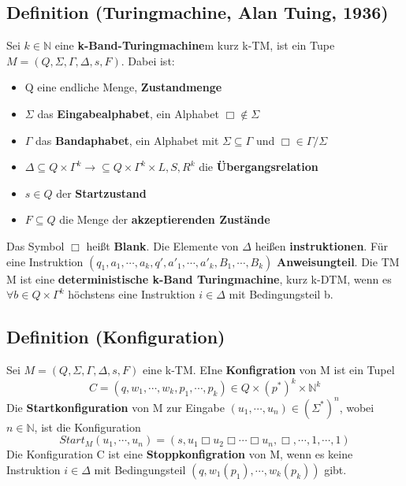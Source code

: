 \subsection{Definition (Turingmachine, Alan Tuing, 1936)} Sei $k \in \mathbb{N}$ eine \textbf{k-Band-Turingmachine}m kurz k-TM, ist ein Tupe $M = (Q, \Sigma, \varGamma, \Delta, s, F )$. Dabei ist:
\begin{itemize}
  \item Q eine endliche Menge, \textbf{Zustandmenge}
  \item $\Sigma$ das \textbf{Eingabealphabet}, ein Alphabet $\Box \not \in \Sigma$
  \item $\varGamma$ das \textbf{Bandaphabet}, ein Alphabet mit $\Sigma \subseteq \varGamma$ und $\Box \in \varGamma / \Sigma$ 
  \item $\Delta \subseteq Q \times \varGamma^{k} \rightarrow \subseteq Q \times \varGamma^{k} \times {L, S, R}^{k}$ die \textbf{Übergangsrelation}
  \item $s \in Q$ der \textbf{Startzustand}
  \item $F \subseteq Q$ die Menge der \textbf{akzeptierenden Zustände} 
\end{itemize}
\begin{sloppypar}
  \noindent Das Symbol $\Box$ heißt \textbf{Blank}. Die Elemente von $\Delta$ heißen \textbf{instruktionen}. Für eine Instruktion $(q_{1}, a_{1}, \cdots, a_{k}, q', a'_{1}, \cdots, a'_{k}, B_{1}, \cdots, B_{k})$ \textbf{Anweisungteil}. Die TM M ist eine \textbf{deterministische k-Band Turingmachine}, kurz k-DTM, wenn es $\forall b \in Q \times \varGamma^{k}$ höchstens eine Instruktion $i \in \Delta$ mit Bedingungsteil b.
\end{sloppypar}

\subsection{Definition (Konfiguration)} Sei $M = (Q, \Sigma, \Gamma, \Delta, s, F)$ eine k-TM. EIne \textbf{Konfigration} von M ist ein Tupel \[C = (q, w_{1}, \cdots, w_{k}, p_{1}, \cdots, p_{k}) \in Q \times (p^{*})^{k} \times \mathbb{N}^{k}\] Die \textbf{Startkonfiguration} von M zur Eingabe $(u_{1}, \cdots, u_{n}) \in (\Sigma^{*})^{n}$, wobei $n \in \mathbb{N}$, ist die Konfiguration \[Start_{M}(u_{1}, \cdots, u_{n}) = (s, u_{1} \Box u_{2} \Box \cdots \Box u_{n}, \Box, \cdots, 1, \cdots, 1)\] Die Konfiguration C ist eine \textbf{Stoppkonfigration} von M, wenn es keine Instruktion $i \in \Delta$ mit Bedingungsteil $(q, w_{1}(p_{1}), \cdots, w_{k}(p_{k}))$ gibt.

